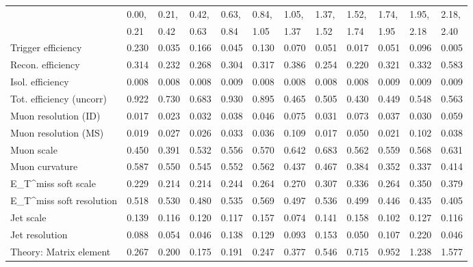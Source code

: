\begin{tabular}{l|p{0.6cm}p{0.6cm}p{0.6cm}p{0.6cm}p{0.6cm}p{0.6cm}p{0.6cm}p{0.6cm}p{0.6cm}p{0.6cm}p{0.6cm}}
\hline
   & 0.00, & 0.21, & 0.42, & 0.63, & 0.84, & 1.05, & 1.37, & 1.52, & 1.74, & 1.95, & 2.18,  \\ 
   & 0.21 & 0.42 & 0.63 & 0.84 & 1.05 & 1.37 & 1.52 & 1.74 & 1.95 & 2.18 & 2.40  \\ 
\hline
Trigger efficiency                       & 0.230 & 0.035 & 0.166 & 0.045 & 0.130 & 0.070 & 0.051 & 0.017 & 0.051 & 0.096 & 0.005 \\
Recon. efficiency                        & 0.314 & 0.232 & 0.268 & 0.304 & 0.317 & 0.386 & 0.254 & 0.220 & 0.321 & 0.332 & 0.583 \\
Isol. efficiency                         & 0.008 & 0.008 & 0.008 & 0.009 & 0.008 & 0.008 & 0.008 & 0.008 & 0.009 & 0.009 & 0.009 \\
Tot. efficiency (uncorr)                 & 0.922 & 0.730 & 0.683 & 0.930 & 0.895 & 0.465 & 0.505 & 0.430 & 0.449 & 0.548 & 0.563 \\
Muon resolution (ID)                     & 0.017 & 0.023 & 0.032 & 0.038 & 0.046 & 0.075 & 0.031 & 0.073 & 0.037 & 0.030 & 0.059 \\
Muon resolution (MS)                     & 0.019 & 0.027 & 0.026 & 0.033 & 0.036 & 0.109 & 0.017 & 0.050 & 0.021 & 0.102 & 0.038 \\
Muon scale                               & 0.450 & 0.391 & 0.532 & 0.556 & 0.570 & 0.642 & 0.683 & 0.562 & 0.559 & 0.568 & 0.631 \\
Muon curvature                           & 0.587 & 0.550 & 0.545 & 0.552 & 0.562 & 0.437 & 0.467 & 0.384 & 0.352 & 0.337 & 0.414 \\
E_{T}^{miss} soft scale                  & 0.229 & 0.214 & 0.214 & 0.244 & 0.264 & 0.270 & 0.307 & 0.336 & 0.264 & 0.350 & 0.379 \\
E_{T}^{miss} soft resolution             & 0.518 & 0.530 & 0.480 & 0.535 & 0.569 & 0.497 & 0.536 & 0.499 & 0.446 & 0.435 & 0.405 \\
Jet scale                                & 0.139 & 0.116 & 0.120 & 0.117 & 0.157 & 0.074 & 0.141 & 0.158 & 0.102 & 0.127 & 0.116 \\
Jet resolution                           & 0.088 & 0.054 & 0.046 & 0.138 & 0.129 & 0.093 & 0.153 & 0.050 & 0.107 & 0.220 & 0.046 \\
Theory: Matrix element                   & 0.267 & 0.200 & 0.175 & 0.191 & 0.247 & 0.377 & 0.546 & 0.715 & 0.952 & 1.238 & 1.577 \\

\end{tabular}
